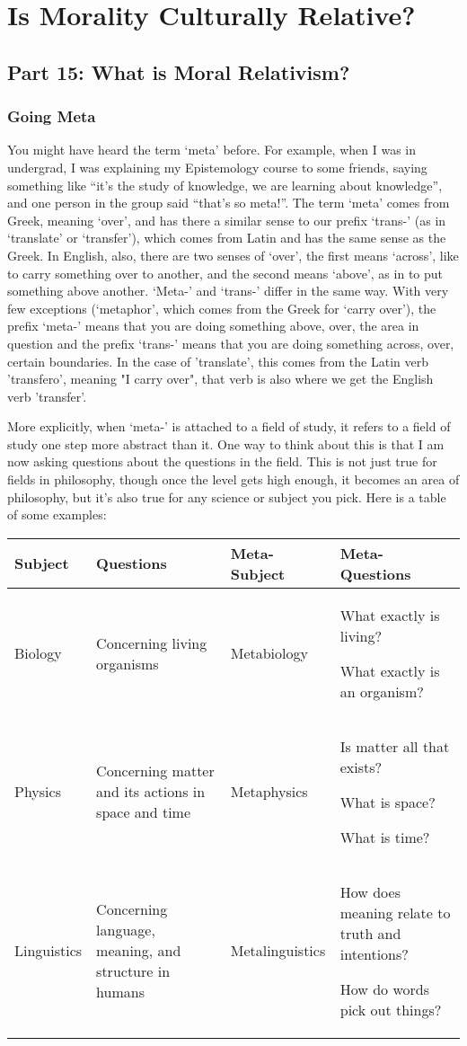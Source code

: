 \part{Is Morality Culturally Relative?}
\label{ch.modseven}

\chapter{Part 15: What is Moral Relativism?}
\section{Going Meta}

You might have heard the term ‘meta’ before. For example, when I was in undergrad, I was explaining my Epistemology course to some friends, saying something like “it’s the study of knowledge, we are learning about knowledge”, and one person in the group said “that’s so meta!”. The term ‘meta’ comes from Greek, meaning ‘over’, and has there a similar sense to our prefix ‘trans-’ (as in ‘translate’ or ‘transfer’), which comes from Latin and has the same sense as the Greek. In English, also, there are two senses of ‘over’, the first means ‘across’, like to carry something over to another, and the second means ‘above’, as in to put something above another. ‘Meta-’ and ‘trans-’ differ in the same way. With very few exceptions (‘metaphor’, which comes from the Greek for ‘carry over’), the prefix ‘meta-’ means that you are doing something above, over, the area in question and the prefix ‘trans-’ means that you are doing something across, over, certain boundaries. In the case of 'translate', this comes from the Latin verb 'transfero', meaning "I carry over", that verb is also where we get the English verb 'transfer'.

More explicitly, when ‘meta-’ is attached to a field of study, it refers to a field of study one step more abstract than it. One way to think about this is that I am now asking questions about the questions in the field. This is not just true for fields in philosophy, though once the level gets high enough, it becomes an area of philosophy, but it’s also true for any science or subject you pick. Here is a table of some examples:
\begin{tabular}{p{0.75in}|p{1in}|p{0.9in}|p{1in}}
Subject&Questions &Meta-Subject&Meta-Questions\\\hline
Biology&Concerning living organisms&Metabiology&What exactly is living? 

What exactly is an organism?\\\hline
Physics&Concerning matter and its actions in space and time&Metaphysics&Is matter all that exists? 

What is space? 

What is time?\\ \hline
Linguistics&Concerning language, meaning, and structure in humans&Metalinguistics&How does meaning relate to truth and intentions? 

How do words pick out things? \\
\end{tabular}

